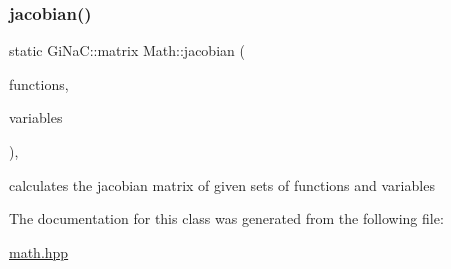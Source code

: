 \subsubsection{\texorpdfstring{jacobian()}{jacobian()}}
{\footnotesize\ttfamily static Gi\+Na\+C\+::matrix Math\+::jacobian (\begin{DoxyParamCaption}\item[{const std\+::vector$<$ Gi\+Na\+C\+::ex $>$ \&}]{functions,  }\item[{const std\+::vector$<$ Gi\+Na\+C\+::symbol $>$ \&}]{variables }\end{DoxyParamCaption})\hspace{0.3cm}{\ttfamily [inline]}, {\ttfamily [static]}}



calculates the jacobian matrix of given sets of functions and variables 



The documentation for this class was generated from the following file\+:\begin{DoxyCompactItemize}
\item 
\mbox{\hyperlink{math_8hpp}{math.\+hpp}}\end{DoxyCompactItemize}
